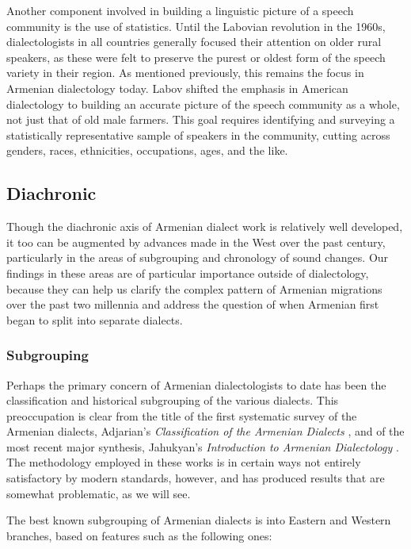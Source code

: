 \documentclass[output=paper]{langscibook}
\begin{document}
Another component involved in building a linguistic picture of a speech community is the use of statistics. Until the Labovian revolution in the 1960s, dialectologists in all countries generally focused their attention on older rural speakers, as these were felt to preserve the purest or oldest form of the speech variety in their region. As mentioned previously, this remains the focus in Armenian dialectology today. Labov shifted the emphasis in American dialectology to building an accurate picture of the speech community as a whole, not just that of old male farmers. This goal requires identifying and surveying a statistically representative sample of speakers in the community, cutting across genders, races, ethnicities, occupations, ages, and the like.

\subsection{Diachronic}\label{sec:vaux:theory:diac}

Though the diachronic axis of Armenian dialect work is relatively well developed, it too can be augmented by advances made in the West over the past century, particularly in the areas of subgrouping and chronology of sound changes. Our findings in these areas are of particular importance outside of dialectology, because they can help us clarify the complex pattern of Armenian migrations over the past two millennia and address the question of when Armenian first began to split into separate dialects.

\subsubsection{Subgrouping}\label{sec:vaux:theory:diac:sub}

Perhaps the primary concern of Armenian dialectologists to date has been the classification and historical subgrouping of the various dialects. This preoccupation is clear from the title of the first systematic survey of the Armenian dialects, Adjarian's \textit{Classification of the Armenian Dialects} \citep{Adjarian-1909-ClassificationArmenianDialect}, and of the most recent major synthesis, Jahukyan's \textit{Introduction to Armenian Dialectology} \citep{Jahukyan-1972-ArmenianDiaolectology}. The methodology employed in these works is in certain ways not entirely satisfactory by modern standards, however, and has produced results that are somewhat problematic, as we will see.


\label{sec:vaux:theory:diac:sub:trad}
The best known subgrouping of Armenian dialects is into Eastern and Western branches, based on features such as the following ones:
\end{document}
